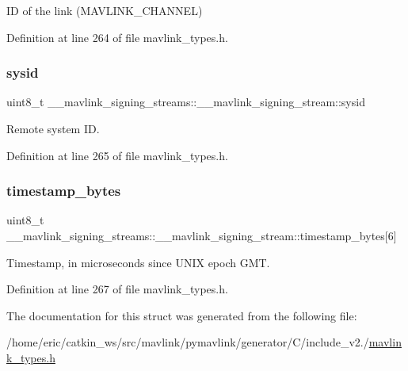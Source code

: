 ID of the link (M\+A\+V\+L\+I\+N\+K\+\_\+\+C\+H\+A\+N\+N\+EL) 



Definition at line 264 of file mavlink\+\_\+types.\+h.

\mbox{\label{struct____mavlink__signing__streams_1_1____mavlink__signing__stream_ab8826081c0e1c8635ab2b706e046b4f6}} 
\subsubsection{\texorpdfstring{sysid}{sysid}}
{\footnotesize\ttfamily uint8\+\_\+t \+\_\+\+\_\+mavlink\+\_\+signing\+\_\+streams\+::\+\_\+\+\_\+mavlink\+\_\+signing\+\_\+stream\+::sysid}



Remote system ID. 



Definition at line 265 of file mavlink\+\_\+types.\+h.

\mbox{\label{struct____mavlink__signing__streams_1_1____mavlink__signing__stream_ac2dacf1fa619460cfe828939921ec091}} 
\subsubsection{\texorpdfstring{timestamp\_bytes}{timestamp\_bytes}}
{\footnotesize\ttfamily uint8\+\_\+t \+\_\+\+\_\+mavlink\+\_\+signing\+\_\+streams\+::\+\_\+\+\_\+mavlink\+\_\+signing\+\_\+stream\+::timestamp\+\_\+bytes\mbox{[}6\mbox{]}}



Timestamp, in microseconds since U\+N\+IX epoch G\+MT. 



Definition at line 267 of file mavlink\+\_\+types.\+h.



The documentation for this struct was generated from the following file\+:\begin{DoxyCompactItemize}
\item 
/home/eric/catkin\+\_\+ws/src/mavlink/pymavlink/generator/\+C/include\+\_\+v2./\mbox{\hyperlink{include__v2_80_2mavlink__types_8h}{mavlink\+\_\+types.\+h}}\end{DoxyCompactItemize}
